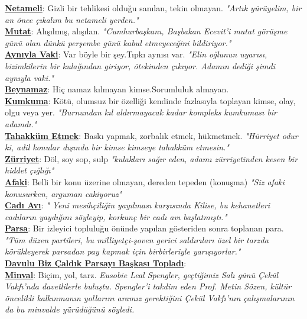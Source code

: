 \documentclass[twocolumn]{article}
\begin{document}
\noindent \underline{\textbf{Netameli}}:\textsf{ Gizli bir tehlikesi olduğu sanılan, tekin olmayan. }\textit{"Artık yürüyelim, bir an önce çıkalım bu netameli yerden."} \\
\noindent \underline{\textbf{Mutat}}:\textsf{ Alışılmış, alışılan. }\textit{"Cumhurbaşkanı, Başbakan Ecevit'i mutat görüşme günü olan dünkü perşembe günü kabul etmeyeceğini bildiriyor."} \\
\noindent \underline{\textbf{Aynıyla Vaki}}:\textsf{ Var böyle bir şey.Tıpkı aynısı var. }\textit{"Elin oğlunun uyarısı, bizimkilerin bir kulağından giriyor, ötekinden çıkıyor. Adamın dediği şimdi aynıyla vaki."} \\
\noindent \underline{\textbf{Beynamaz}}:\textsf{ Hiç namaz kılmayan kimse.Sorumluluk almayan. }\textit{ } \\
\noindent \underline{\textbf{Kumkuma}}:\textsf{ Kötü, olumsuz bir özelliği kendinde fazlasıyla toplayan kimse, olay, olgu veya yer. }\textit{"Burnundan kıl aldırmayacak kadar kompleks kumkuması bir adamdı."} \\
\noindent \underline{\textbf{Tahakküm Etmek}}:\textsf{ Baskı yapmak, zorbalık etmek, hükmetmek. }\textit{"Hürriyet odur ki, adil konular dışında bir kimse kimseye tahakküm etmesin."} \\
\noindent \underline{\textbf{Zürriyet}}:\textsf{ Döl, soy sop, sulp }\textit{"kulakları sağır eden, adamı zürriyetinden kesen bir hiddet çığlığı"} \\
\noindent \underline{\textbf{Afaki}}:\textsf{ Belli bir konu üzerine olmayan, dereden tepeden (konuşma) }\textit{"Siz afaki konusurken, arguman cakiyoruz"} \\
\noindent \underline{\textbf{Cadı Avı}}:\textsf{ }\textit{ " Yeni mesihçiliğin yayılması karşısında Kilise, bu kehanetleri cadıların yaydığını söyleyip, korkunç bir cadı avı başlatmıştı." } \\
\noindent \underline{\textbf{Parsa}}:\textsf{ Bir izleyici topluluğu önünde yapılan gösteriden sonra toplanan para. }\textit{"Tüm düzen partileri, bu milliyetçi-şoven gerici saldırıları özel bir tarzda körükleyerek parsadan pay kapmak için birbirleriyle yarışıyorlar."} \\
\noindent \underline{\textbf{Davulu Biz Çaldık Parsayı Başkası Topladı}}:\textsf{ }\textit{ } \\
\noindent \underline{\textbf{Minval}}:\textsf{ Biçim, yol, tarz. }\textit{Eusobie Leal Spengler, geçtiğimiz Salı günü Çekül Vakfı’nda davetlilerle buluştu. Spengler’i takdim eden Prof. Metin Sözen, kültür öncelikli kalkınmanın yollarını aramız gerektiğini Çekül Vakfı’nın çalışmalarının da bu minvalde yürüdüğünü söyledi.} \\
\end{document}
